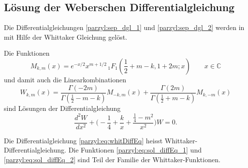 \subsection{Lösung der Weberschen Differentialgleichung}
Die Differentialgleichungen \eqref{parzyl:sep_dgl_1} und \eqref{parzyl:sep_dgl_2} werden in \cite{parzyl:whittaker}
mit Hilfe der Whittaker Gleichung gelöst.
\begin{satz}
	Die Funktionen 
	\begin{equation}
		 M_{k,m}(x) = 
		    e^{-x/2} x^{m+1/2} \,
		    {}_{1} F_{1}
		    (
		        {\textstyle \frac{1}{2}} 
		        + m - k, 1 + 2m; x) \qquad x \in \mathbb{C}
		 \label{parzyl:eq:sol_diffEq_1}
	\end{equation}
	und damit auch die Linearkombinationen 
	 \begin{equation}
		        W_{k,m}(x) = \frac{
		            \Gamma \left( -2m\right)
		        }{
		            \Gamma \left( {\textstyle \frac{1}{2}} - m - k\right)
		        }
		        M_{-k, m} \left(x\right)
		        +
		        \frac{
		            \Gamma \left( 2m\right)
		        }{
		            \Gamma \left( {\textstyle \frac{1}{2}} + m - k\right)
		        }
		       M_{k, -m} \left(x\right)
		      \label{parzyl:eq:sol_diffEq_2}
	\end{equation}
	sind Lösungen der Differentialgleichung 
	\begin{equation}
		        \frac{d^2W}{d x^2} +
		        \biggl( -\frac{1}{4}  + \frac{k}{x} + \frac{\frac{1}{4} - m^2}{x^2} \biggr) W = 0.
		        \label{parzyl:eq:whitDiffEq}
	\end{equation}
	
\end{satz}
\begin{definition}
	Die Differentialgleichung \ref{parzyl:eq:whitDiffEq}  heisst Whittaker-Differentialgleichung. Die Funktionen \ref{parzyl:eq:sol_diffEq_1} und \ref{parzyl:eq:sol_diffEq_2} sind Teil der Familie der Whittaker-Funktionen.
\end{definition}
